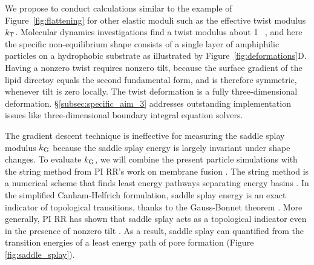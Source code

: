 We propose to conduct calculations similar to the example of Figure~\ref{fig:flattening} for other elastic moduli such as the effective twist modulus $k_{\mathrm{T}}$.
Molecular dynamics investigations find a twist modulus about 1
\kBT~\cite{LeVeWa14}, and here the specific non-equilibrium shape consists of
a single layer of amphiphilic particles on a hydrophobic substrate as
illustrated by Figure~\ref{fig:deformations}D. Having a nonzero twist
requires nonzero tilt, because the surface gradient of the lipid
directoy equals the second fundamental form, and is therefore symmetric,
whenever tilt is zero locally. The twist deformation is a fully
three-dimensional deformation. \S\ref{subsec:specific_aim_3} addresses outstanding implementation issues like three-dimensional boundary integral equation solvers.

%
The gradient descent technique is ineffective for measuring the saddle splay modulus $k_{\mathrm{G}}$ because
the saddle splay energy is largely invariant under shape changes.
To evaluate $k_{\mathrm{G}}$, we will combine the present particle simulations with the string method 
from PI RR's work on membrane fusion \cite{RyKlYaCo16}. The string method is a numerical scheme that finds
least energy pathways separating energy basins \cite{doi:10.1063/1.2720838}. 
In the simplified Canham-Helfrich formulation, saddle splay energy is an exact indicator of topological transitions, 
thanks to the  Gauss-Bonnet theorem \cite{TerziDeserno17}.
More generally, PI RR has shown that saddle splay acts as a topological indicator even in the presence of nonzero tilt \cite{RyKlYaCo16}. 
As a result, saddle splay can quantified from the transition energies of a least energy path of pore formation (Figure \ref{fig:saddle_splay}).   
%
%

